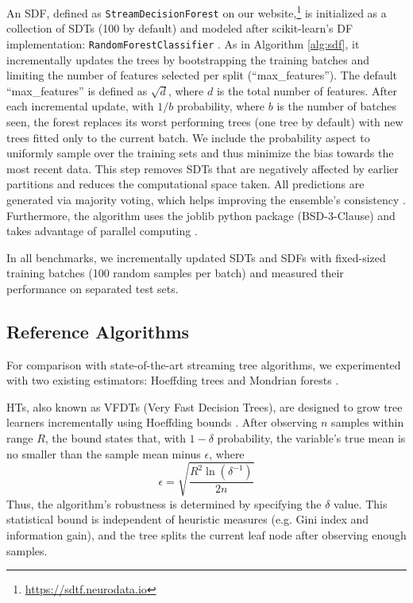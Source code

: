 An SDF, defined as \texttt{StreamDecisionForest} on our website,\footnote{\url{https://sdtf.neurodata.io}}
is initialized as a collection of SDTs (100 by default) and modeled after scikit-learn's DF implementation: \texttt{RandomForestClassifier} \citep{pedregosa_scikit-learn_2011}. As in Algorithm \ref{alg:sdf}, it incrementally updates the trees by bootstrapping the training batches and limiting the number of features selected per split (``max\_features''). The default ``max\_features'' is defined as $\sqrt{d}$, where $d$ is the total number of features. After each incremental update, with $1/b$ probability, where $b$ is the number of batches seen, the forest replaces its worst performing trees (one tree by default) with new trees fitted only to the current batch. We include the probability aspect to uniformly sample over the training sets and thus minimize the bias towards the most recent data. This step removes SDTs that are negatively affected by earlier partitions and reduces the computational space taken. All predictions are generated via majority voting, which helps improving the ensemble's consistency \citep{liaw_classification_2002, biau_consistency_2008, breiman_random_2001}. Furthermore, the algorithm uses the joblib python package (BSD-3-Clause) and takes advantage of parallel computing \citep{joblib_developers_joblibjoblib_2022}.

In all benchmarks, we incrementally updated SDTs and SDFs with fixed-sized training batches (100 random samples per batch) and measured their performance on separated test sets.

\subsection{Reference Algorithms}
For comparison with state-of-the-art streaming tree algorithms, we experimented with two existing estimators: Hoeffding trees and Mondrian forests \citep{domingos_mining_2000, lakshminarayanan_mondrian_2014, khannouz_benchmark_2020, pfahringer_new_2007, gomes_machine_2019, lakshminarayanan_mondrian_2016}. 

HTs, also known as VFDTs (Very Fast Decision Trees), are designed to grow tree learners incrementally using Hoeffding bounds \citep{domingos_mining_2000, hoeffding_probability_1994}. 
After observing $n$ samples within range $R$, the bound states that, with $1 - \delta$ probability, the variable's true mean is no smaller than the sample mean minus $\epsilon$, where 
\begin{equation*} \epsilon=\sqrt{\frac{R^2\ln(\delta^{-1})}{2n}} \tag{1} \end{equation*}
Thus, the algorithm's robustness is determined by specifying the $\delta$ value.
This statistical bound is independent of heuristic measures (e.g. Gini index and information gain), and the tree splits the current leaf node after observing enough samples.

